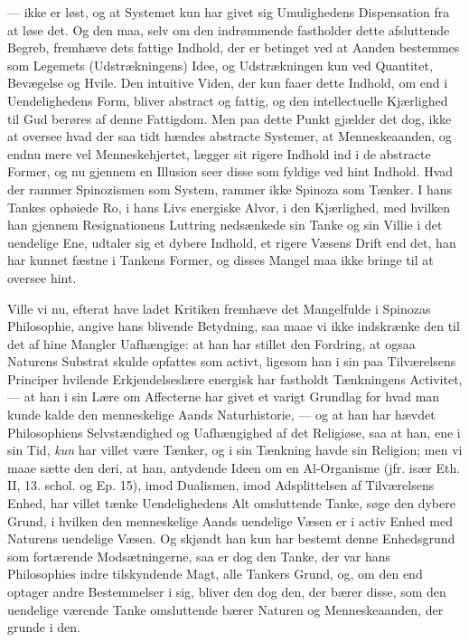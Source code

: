 \documentclass[12pt,a4paper]{book}
\newcommand{\opage}[1]{\marginnote{\footnotesize\textit{[#1]}}}
\begin{document}
--- ikke er løst, og at Systemet kun har givet sig
Umulighedens Dispensation fra at løse det. Og den maa,
selv om den indrømmende fastholder dette afsluttende Begreb,
fremhæve dets fattige Indhold, der er betinget ved at
Aanden bestemmes som Legemets (Udstrækningens) Idee,
og Udstrækningen kun ved Quantitet, Bevægelse og Hvile.
Den intuitive Viden, der kun faaer dette Indhold, om end i
Uendelighedens Form, bliver abstract og fattig, og den intellectuelle
Kjærlighed til Gud berøres af denne Fattigdom.
Men paa dette Punkt gjælder det dog, ikke at oversee hvad
der saa tidt hændes abstracte Systemer, at Menneskeaanden,
og endnu mere vel Menneskehjertet, lægger sit rigere Indhold
ind i de abstracte Former, og nu gjennem en Illusion
seer disse som fyldige ved hint Indhold. Hvad der rammer
Spinozismen som System, rammer ikke Spinoza som Tænker.
I hans Tankes ophøiede Ro, i hans Livs energiske Alvor,
i den Kjærlighed, med hvilken han gjennem Resignationens
Luttring nedsænkede sin Tanke og sin Villie i det uendelige
Ene, udtaler sig et dybere Indhold, et rigere Væsens Drift
\opage{181} end det, han har kunnet fæstne i Tankens Former, og disses
Mangel maa ikke bringe til at oversee hint.

Ville vi nu, efterat have ladet Kritiken fremhæve det
Mangelfulde i Spinozas Philosophie, angive hans blivende
Betydning, saa maae vi ikke indskrænke den til det af hine
Mangler Uafhængige: at han har stillet den Fordring, at
ogsaa Naturens Substrat skulde opfattes som activt, ligesom
han i sin paa Tilværelsens Principer hvilende Erkjendelseslære
energisk har fastholdt Tænkningens Activitet, --- at
han i sin Lære om Affecterne har givet et varigt Grundlag
for hvad man kunde kalde den menneskelige Aands Naturhistorie,
--- og at han har hævdet Philosophiens Selvstændighed
og Uafhængighed af det Religiøse, saa at han, ene i sin
Tid, \emph{kun} har villet være Tænker, og i sin Tænkning havde
sin Religion; men vi maae sætte den deri, at han, antydende
Ideen om en Al-Organisme (jfr. især Eth. II, 13. schol. og
Ep. 15), imod Dualismen, imod Adsplittelsen af Tilværelsens
Enhed, har villet tænke Uendelighedens Alt omsluttende
Tanke, søge den dybere Grund, i hvilken den menneskelige
Aands uendelige Væsen er i activ Enhed med Naturens
uendelige Væsen. Og skjøndt han kun har bestemt denne
Enhedsgrund som fortærende Modsætningerne, saa er dog
den Tanke, der var hans Philosophies indre tilskyndende
Magt, alle Tankers Grund, og, om den end optager andre
Bestemmelser i sig, bliver den dog den, der bærer disse, som
den uendelige værende Tanke omsluttende bærer Naturen og
Menneskeaanden, der grunde i den.
\end{document}
